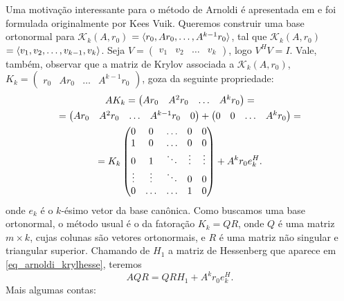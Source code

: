 Uma motivação interessante para o método de Arnoldi é apresentada em \cite[pág. 337]{Meurant1999Computer} e foi formulada originalmente por Kees Vuik. Queremos construir uma base ortonormal para $\mathcal{K}_k(A,r_0)$ $={\langle r_0,Ar_0,\ldots,A^{k-1}r_0\rangle}$, tal que $\mathcal{K}_k(A,r_0)$ $={\langle v_1,v_2,\ldots,v_{k-1},v_k\rangle}$. Seja $V=\begin{pmatrix}v_1&v_2&\ldots &v_k\end{pmatrix}$, logo $V^HV=I$. Vale, também, observar que a matriz de Krylov  associada a $\mathcal{K}_k(A,r_0)$, ${K}_k=\begin{pmatrix} r_0&Ar_0&\ldots&A^{k-1}r_0\end{pmatrix}$, goza da seguinte propriedade:
\begin{gather}
A{K}_k=\begin{pmatrix} Ar_0&A^2r_0&\ldots&A^kr_0\end{pmatrix}=\notag\\
=\begin{pmatrix} Ar_0&A^2r_0&\ldots&A^{k-1}r_0&0\end{pmatrix} +\begin{pmatrix} 0&0&\ldots&A^kr_0\end{pmatrix}=\notag\\
={K}_k\begin{pmatrix}
0 & 0 & \ldots & 0 & 0 \\
1 & 0 & \ldots & 0 & 0  \\
0 & 1& \ddots & \vdots & \vdots\\
\vdots & \vdots & \ddots & 0 & 0\\
0 & \ldots & \ldots & 1 & 0 \\
\end{pmatrix}+A^kr_0e_k^H. \label{eq_arnoldi_krylhesse}
\end{gather}
onde $e_k$ é o $k$-ésimo vetor da base canônica. Como buscamos uma base ortonormal, o método usual é o da fatoração ${K}_k=QR$, onde $Q$ é uma matriz $m\times k$, cujas colunas são vetores ortonormais, e $R$ é uma matriz não singular e triangular superior. Chamando de $H_1$ a matriz de Hessenberg que aparece em \eqref{eq_arnoldi_krylhesse}, teremos
\[AQR=QRH_1+A^kr_0e_k^H.\]
Mais algumas contas:

